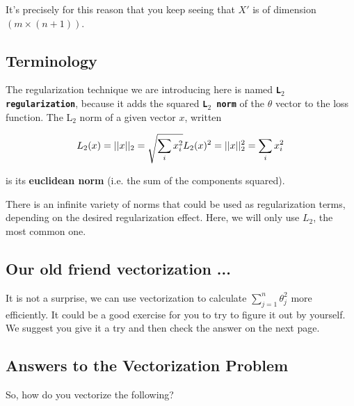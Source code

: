 It's precisely for this reason that you keep seeing that $X'$ is of dimension $(m \times (n+1))$.


\subsection*{Terminology}
The regularization technique we are introducing here is named \texttt{\textbf{L$_2$ regularization}}, because it adds the squared \texttt{\textbf{L$_2$ norm}} of the $\theta$ vector to the loss function.
The L$_2$ norm of a given vector $x$, written

$$
L_2(x) = ||x||_2 = \sqrt{\sum_i x_i^2} \\
L_2(x)^2 = ||x||_2^2 = \sum_i x_i^2
$$

is its \textbf{euclidean norm} (i.e. the sum of the components squared).  

There is an infinite variety of norms that could be used as regularization terms, depending on the desired regularization effect.
Here, we will only use $L_2$, the most common one.



\subsection*{Our old friend vectorization ...}
It is not a surprise, we can use vectorization to calculate $\sum_{j = 1}^n \theta_j^2$  more efficiently.
It could be a good exercise for you to try to figure it out by yourself.
We suggest you give it a try and then check the answer on the next page.


\subsection*{Answers to the Vectorization Problem}
So, how do you vectorize the following?

